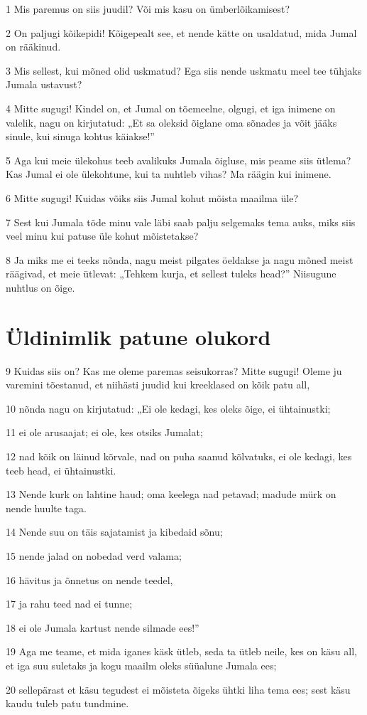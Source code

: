 \par 1 Mis paremus on siis juudil? Või mis kasu on ümberlõikamisest?
\par 2 On paljugi kõikepidi! Kõigepealt see, et nende kätte on usaldatud, mida Jumal on rääkinud.
\par 3 Mis sellest, kui mõned olid uskmatud? Ega siis nende uskmatu meel tee tühjaks Jumala ustavust?
\par 4 Mitte sugugi! Kindel on, et Jumal on tõemeelne, olgugi, et iga inimene on valelik, nagu on kirjutatud: „Et sa oleksid õiglane oma sõnades ja võit jääks sinule, kui sinuga kohtus käiakse!”
\par 5 Aga kui meie ülekohus teeb avalikuks Jumala õigluse, mis peame siis ütlema? Kas Jumal ei ole ülekohtune, kui ta nuhtleb vihas? Ma räägin kui inimene.
\par 6 Mitte sugugi! Kuidas võiks siis Jumal kohut mõista maailma üle?
\par 7 Sest kui Jumala tõde minu vale läbi saab palju selgemaks tema auks, miks siis veel minu kui patuse üle kohut mõistetakse?
\par 8 Ja miks me ei teeks nõnda, nagu meist pilgates öeldakse ja nagu mõned meist räägivad, et meie ütlevat: „Tehkem kurja, et sellest tuleks head?” Niisugune nuhtlus on õige.

\section*{Üldinimlik patune olukord}

\par 9 Kuidas siis on? Kas me oleme paremas seisukorras? Mitte sugugi! Oleme ju varemini tõestanud, et niihästi juudid kui kreeklased on kõik patu all,
\par 10 nõnda nagu on kirjutatud: „Ei ole kedagi, kes oleks õige, ei ühtainustki;
\par 11 ei ole arusaajat; ei ole, kes otsiks Jumalat;
\par 12 nad kõik on läinud kõrvale, nad on puha saanud kõlvatuks, ei ole kedagi, kes teeb head, ei ühtainustki.
\par 13 Nende kurk on lahtine haud; oma keelega nad petavad; madude mürk on nende huulte taga.
\par 14 Nende suu on täis sajatamist ja kibedaid sõnu;
\par 15 nende jalad on nobedad verd valama;
\par 16 hävitus ja õnnetus on nende teedel,
\par 17 ja rahu teed nad ei tunne;
\par 18 ei ole Jumala kartust nende silmade ees!”
\par 19 Aga me teame, et mida iganes käsk ütleb, seda ta ütleb neile, kes on käsu all, et iga suu suletaks ja kogu maailm oleks süüalune Jumala ees;
\par 20 sellepärast et käsu tegudest ei mõisteta õigeks ühtki liha tema ees; sest käsu kaudu tuleb patu tundmine.

